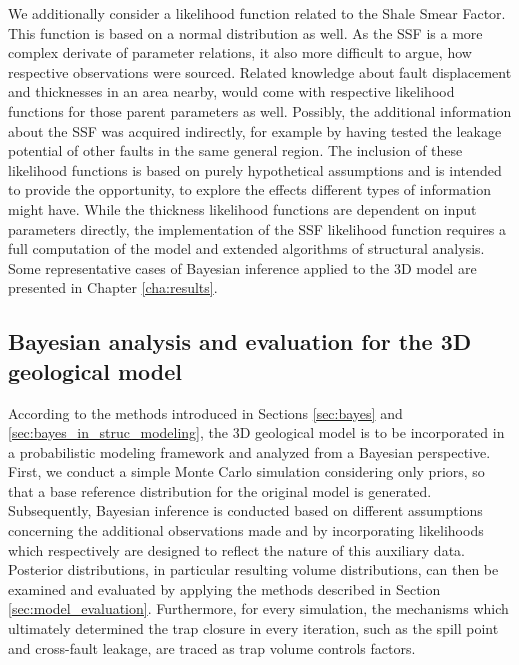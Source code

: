 		We additionally consider a likelihood function related to the Shale Smear Factor. This function is based on a normal distribution as well. As the SSF is a more complex derivate of parameter relations, it also more difficult to argue, how respective observations were sourced. Related knowledge about fault displacement and thicknesses in an area nearby, would come with respective likelihood functions for those parent parameters as well. Possibly, the additional information about the SSF was acquired indirectly, for example by having tested the leakage potential of other faults in the same general region. The inclusion of these likelihood functions is based on purely hypothetical assumptions and is intended to provide the opportunity, to explore the effects different types of information might have. While the thickness likelihood functions are dependent on input parameters directly, the implementation of the SSF likelihood function requires a full computation of the model and extended algorithms of structural analysis.\\
		Some representative cases of Bayesian inference applied to the 3D model are presented in Chapter \ref{cha:results}.
		
		\subsection{Bayesian analysis and evaluation for the 3D geological model}
		According to the methods introduced in Sections \ref{sec:bayes} and \ref{sec:bayes_in_struc_modeling}, the 3D geological model is to be incorporated in a probabilistic modeling framework and analyzed from a Bayesian perspective.
		First, we conduct a simple Monte Carlo simulation considering only priors, so that a base reference distribution for the original model is generated. Subsequently, Bayesian inference is conducted based on different assumptions concerning the additional observations made and by incorporating likelihoods which respectively are designed to reflect the nature of this auxiliary data. Posterior distributions, in particular resulting volume distributions, can then be examined and evaluated by applying the methods described in Section \ref{sec:model_evaluation}. Furthermore, for every simulation, the mechanisms which ultimately determined the trap closure in every iteration, such as the spill point and cross-fault leakage, are traced as trap volume controls factors.
		

